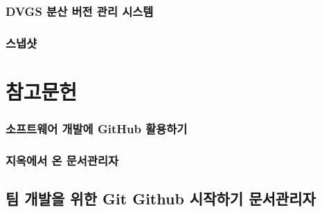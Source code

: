 \documentclass[12pt, a4paper, oneside]{book}
\let\stdsection\section
\renewcommand\section{\newpage\stdsection}
\begin{document}
	\section 	{DVGS 분산 버전 관리 시스템}


%										
	\section 	{스냅샷}




	\part{ 참고문헌 }
	\noptcrule
	\parttoc				


%										
	\section 	{소프트웨어 개발에 GitHub 활용하기}




%										
	\section 	{지옥에서 온 문서관리자}






%										
	\chapter 	{팀 개발을 위한 	Git Github 시작하기 문서관리자}
	\minitoc
\end{document}
